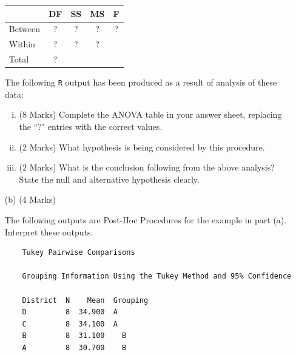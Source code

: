 \documentclass[a4paper,12pt]{article}
\begin{document}
\begin{itemize}
{	\begin{center}
		\begin{tabular}{|l||c|c|c|c|}
			\hline \phantom{makespace} & DF & SS & MS & F \\ \hline
			\hline Between & \phantom{make}? \phantom{make} & \phantom{make}? \phantom{make} & ?  &  ?\\ 
			\hline Within & \phantom{make}? \phantom{make} &\phantom{make}? \phantom{make}  &\phantom{make}? \phantom{make} &  \\ \hline
			\hline Total &  \phantom{make}? \phantom{make} &  &\phantom{makespace}  & \phantom{makespace} \\ 
			\hline 
		\end{tabular} 
	\end{center}
}
\bigskip
The following \texttt{R} output has been produced as a result of analysis of these data:


%


\begin{enumerate}[(i)]
	\item (8 Marks) Complete the ANOVA table in your answer sheet, replacing the ``?" entries with the correct values.
	\item (2 Marks) What hypothesis is being considered by this procedure.
	\item (2 Marks) What is the conclusion following from the above analysis? State the null and alternative hypothesis clearly.
\end{enumerate}


\newpage
\item[(b)] (4 Marks)

The following outputs are Post-Hoc Procedures for the example in part (a). Interpret these outputs.

\begin{framed}
	\begin{verbatim}
	Tukey Pairwise Comparisons 
	
	Grouping Information Using the Tukey Method and 95% Confidence
	
	District  N    Mean  Grouping
	D         8  34.900  A
	C         8  34.100  A
	B         8  31.100    B
	A         8  30.700    B
	

\end{verbatim}
\end{framed}
\end{itemize}
\end{document}
